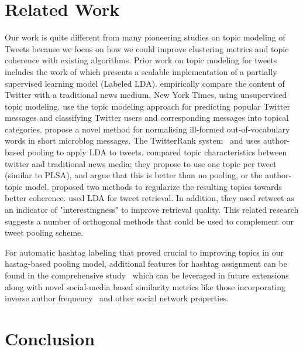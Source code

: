 \documentclass{sig-alternate}
\begin{document}
\section{Related Work}

\label{sec:related_work}

Our work is quite different from many pioneering studies
on topic modeling of Tweets because we focus on how we could
improve clustering metrics and topic coherence with existing algorithms.
Prior work on topic modeling for tweets includes the work of
\cite{ramage} which presents a scalable implementation of a partially
supervised learning model (Labeled LDA).
\cite{wayne} empirically compare the content of
Twitter with a traditional news medium, New York Times, using
unsupervised topic modeling. \cite{hong} use the topic modeling
approach for predicting popular Twitter messages and classifying
Twitter users and corresponding messages into topical
categories. \cite{han2012tist} propose a novel method for normalising
ill-formed out-of-vocabulary words in short microblog messages.  The
{T}witterRank system~\cite{Weng2010wsdm} and \cite{hong} uses
author-based pooling to apply LDA to tweets. \cite{wayne} compared
topic characteristics between twitter and traditional news media; they
propose to use one topic per tweet (similar to PLSA), and argue that
this is better than no pooling, or the author-topic model.
\cite{newman11} proposed two methods to regularize the
resulting topics towards better coherence.
\cite{Naveed2011cikm} used LDA for tweet retrieval. In addition, they
used retweet as an indicator of "interestingness" to improve retrieval
quality.  This related research suggests a number of orthogonal
methods that could be used to complement our tweet pooling scheme.

For automatic hashtag labeling that proved crucial to improving topics
in our hastag-based pooling model, additional features for hashtag
assignment can be found in the comprehensive study~\cite{yang2012www}
which can be leveraged in future extensions along with novel 
social-media based similarity metrics like those incorporating inverse
author frequency~\cite{iaf} and other social network properties.

\section{Conclusion}
\end{document}

